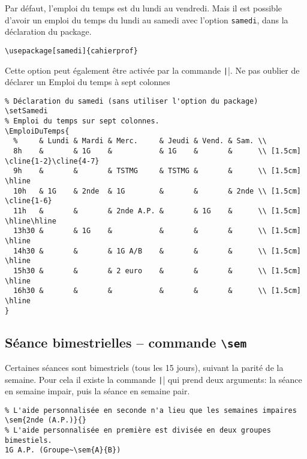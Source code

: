 \documentclass[a4paper,french,10pt]{article}
\begin{document}
Par défaut, l'emploi du temps est du lundi au vendredi. Mais il est possible
d'avoir un emploi du temps du lundi au samedi avec l'option \texttt{samedi},
dans la déclaration du package.
\begin{verbatim}
\usepackage[samedi]{cahierprof}
\end{verbatim}
Cette option peut également être activée par la commande
\texttt|\setSamedi|. Ne pas oublier de déclarer un Emploi du temps à
sept colonnes
\begin{verbatim}
% Déclaration du samedi (sans utiliser l'option du package)
\setSamedi
% Emploi du temps sur sept colonnes.
\EmploiDuTemps{
  %     & Lundi & Mardi & Merc.     & Jeudi & Vend. & Sam. \\
  8h    &       & 1G    &           & 1G    &       &      \\ [1.5cm] \cline{1-2}\cline{4-7}
  9h    &       &       & TSTMG     & TSTMG &       &      \\ [1.5cm] \hline
  10h   & 1G    & 2nde  & 1G        &       &       & 2nde \\ [1.5cm] \cline{1-6}
  11h   &       &       & 2nde A.P. &       & 1G    &      \\ [1.5cm] \hline\hline
  13h30 &       & 1G    &           &       &       &      \\ [1.5cm] \hline
  14h30 &       &       & 1G A/B    &       &       &      \\ [1.5cm] \hline
  15h30 &       &       & 2 euro    &       &       &      \\ [1.5cm] \hline
  16h30 &       &       &           &       &       &      \\ [1.5cm] \hline
}
\end{verbatim}

\subsection{Séance bimestrielles -- commande \texttt{\textbackslash{}sem}}

Certaines séances sont bimestriels (tous les 15 jours), suivant la parité de la
semaine. Pour cela il existe la commande \texttt|\sem| qui prend
deux arguments: la séance en semaine impair, puis la séance en semaine pair.

\begin{verbatim}
% L'aide personnalisée en seconde n'a lieu que les semaines impaires
\sem{2nde (A.P.)}{}
% L'aide personnalisée en première est divisée en deux groupes bimestiels. 
1G A.P. (Groupe~\sem{A}{B})
\end{verbatim}
\end{document}
